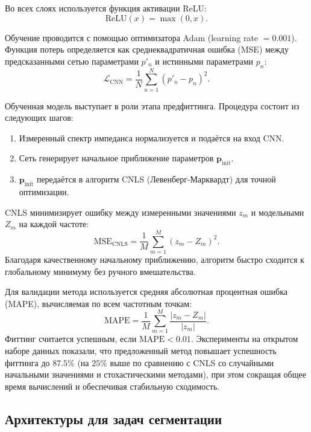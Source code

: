 Во всех слоях используется функция активации ReLU:
\begin{equation}
    \text{ReLU}(x) = \max(0, x).
\end{equation}

Обучение проводится с помощью оптимизатора Adam (learning rate $= 0.001$). Функция потерь определяется как среднеквадратичная ошибка (MSE) между предсказанными сетью параметрами $p'_n$ и истинными параметрами $p_n$:
\begin{equation}
    \mathcal{L}_{\text{CNN}} = \frac{1}{N} \sum_{n=1}^{N} (p'_n - p_n)^2.
\end{equation}

Обученная модель выступает в роли этапа предфиттинга. Процедура состоит из следующих шагов:
\begin{enumerate}[leftmargin=*]
    \item Измеренный спектр импеданса нормализуется и подаётся на вход CNN.
    \item Сеть генерирует начальное приближение параметров $\mathbf{p}_{\text{init}}$.
    \item $\mathbf{p}_{\text{init}}$ передаётся в алгоритм CNLS (Левенберг-Марквардт) для точной оптимизации.
\end{enumerate}

CNLS минимизирует ошибку между измеренными значениями $z_m$ и модельными $Z_m$ на каждой частоте:
\begin{equation}
    \text{MSE}_{\text{CNLS}} = \frac{1}{M} \sum_{m=1}^{M} (z_m - Z_m)^2.
\end{equation}
Благодаря качественному начальному приближению, алгоритм быстро сходится к глобальному минимуму без ручного вмешательства.

Для валидации метода используется средняя абсолютная процентная ошибка (MAPE), вычисляемая по всем частотным точкам:
\begin{equation}
    \text{MAPE} = \frac{1}{M} \sum_{m=1}^{M} \frac{|z_m - Z_m|}{|z_m|}.
\end{equation}
Фиттинг считается успешным, если $\text{MAPE} < 0.01$. Эксперименты на открытом наборе данных показали, что предложенный метод повышает успешность фиттинга до $87.5\%$ (на $25\%$ выше по сравнению с CNLS со случайными начальными значениями и стохастическими методами), при этом сокращая общее время вычислений и обеспечивая стабильную сходимость.

\subsection{Архитектуры для задач сегментации}

